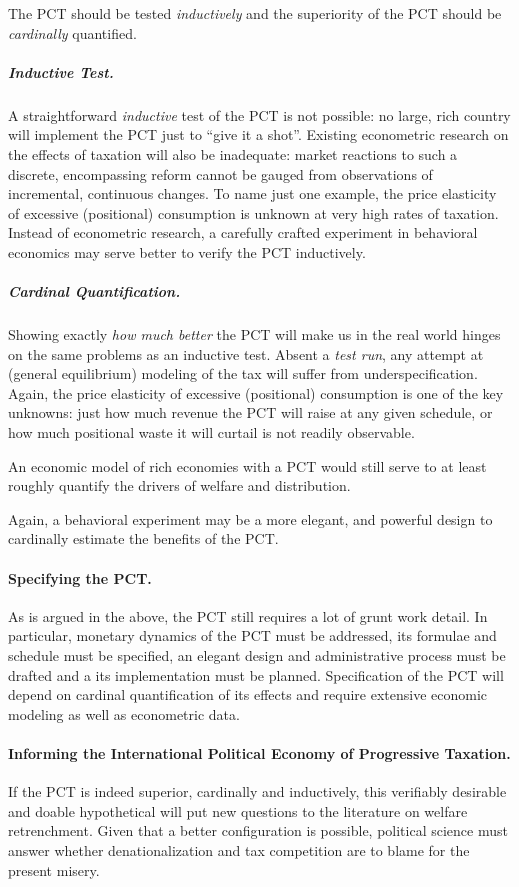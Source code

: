 	The PCT should be tested \emph{inductively} and the superiority of the PCT should be \emph{cardinally} quantified.

\subparagraph{Inductive Test.}
A straightforward \emph{inductive} test of the PCT is not possible:
no large, rich country will implement the PCT just to ``give it a shot''.
Existing econometric research on the effects of taxation will also be inadequate:
market reactions to such a discrete, encompassing reform cannot be gauged from observations of incremental, continuous changes.
To name just one example, the price elasticity of excessive (positional) consumption is unknown at very high rates of taxation.
Instead of econometric research, a carefully crafted experiment in behavioral economics may serve better to verify the PCT inductively.

\subparagraph{Cardinal Quantification.}
Showing exactly \emph{how much better} the PCT will make us in the real world hinges on the same problems as an inductive test.
Absent a \emph{test run}, any attempt at (general equilibrium) modeling of the tax will suffer from underspecification.
Again, the price elasticity of excessive (positional) consumption is one of the key unknowns:
just how much revenue the PCT will raise at any given schedule, or how much positional waste it will curtail is not readily observable.

An economic model of rich economies with a PCT would still serve to at least roughly quantify the drivers of welfare and distribution.

Again, a behavioral experiment may be a more elegant, and powerful design to cardinally estimate the benefits of the PCT.

\paragraph{Specifying the PCT.}
As is argued in the above, the PCT still requires a lot of grunt work detail.
In particular, monetary dynamics of the PCT must be addressed, its formulae and schedule must be specified, an elegant design and administrative process must be drafted and a its implementation must be planned.
Specification of the PCT will depend on cardinal quantification of its effects and require extensive economic modeling as well as econometric data.

\paragraph{Informing the International Political Economy of Progressive Taxation.}
If the PCT is indeed superior, cardinally and inductively, this verifiably desirable and doable hypothetical will put new questions to the literature on welfare retrenchment.
Given that a better configuration is possible, political science must answer whether denationalization and tax competition are to blame for the present misery.

